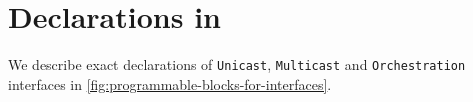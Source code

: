 \documentclass[letterpaper,twocolumn,10pt]{article}
\begin{document}
\clearpage




\appendix
\section{Declarations in \uarch}
\label{appendix:section:micro-switch-architecture}
We describe exact declarations of \texttt{Unicast}, 
\texttt{Multicast} and \texttt{Orchestration} interfaces in 
\cref{fig:programmable-blocks-for-interfaces}. 

%   
\end{document}
